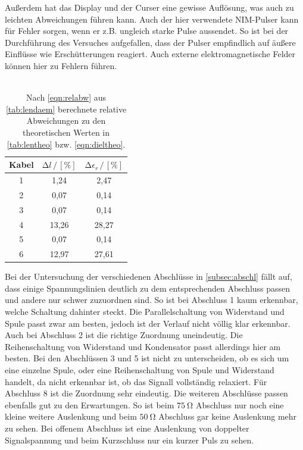 Außerdem hat das Display und der Curser eine gewisse Auflösung, was auch zu leichten Abweichungen führen kann.
Auch der hier verwendete NIM-Pulser kann für Fehler sorgen, wenn er z.B. ungleich starke Pulse aussendet. 
So ist bei der Durchführung des Versuches aufgefallen, dass der Pulser empfindlich auf äußere Einflüsse wie Erschütterungen reagiert. 
Auch externe elektromagnetische Felder können hier zu Fehlern führen. 
\\\\
\begin{table}[H]
    \centering
    \caption{Nach \autoref{eqn:relabw} aus \autoref{tab:lendaem} berechnete relative Abweichungen zu den theoretischen Werten in \autoref{tab:lentheo} bzw. \autoref{eqn:dieltheo}.}
    \begin{tabular}{ccc}
    \toprule
    Kabel & $\increment l \,/\, [\%]$ & $\increment \epsilon_r \,/\, [\%] $\\
    \midrule
    1 &  1,24  & 2,47 \\
    2 &  0,07  & 0,14 \\
    3 &  0,07  & 0,14 \\
    4 & 13,26 & 28,27 \\
    5 &  0,07  & 0,14 \\
    6 & 12,97 & 27,61 \\
    \bottomrule
    \end{tabular}
    \label{tab:relabw}
\end{table}
Bei der Untersuchung der verschiedenen Abschlüsse in \autoref{subsec:abschl} fällt auf, dass einige Spannungslinien deutlich zu dem entsprechenden Abschluss passen und andere nur schwer zuzuordnen sind.
So ist bei Abschluss 1 kaum erkennbar, welche Schaltung dahinter steckt. 
Die Parallelschaltung von Widerstand und Spule passt zwar am besten, jedoch ist der Verlauf nicht völlig klar erkennbar. 
Auch bei Abschluss 2 ist die richtige Zuordnung uneindeutig.
Die Reihenschaltung von Widerstand und Kondensator passt allerdings hier am besten.
Bei den Abschlüssen 3 und 5 ist nicht zu unterscheiden, ob es sich um eine einzelne Spule, oder eine Reihenschaltung von Spule und Widerstand handelt, da nicht erkennbar ist, ob das Signall vollständig relaxiert. 
Für Abschluss 8 ist die Zuordnung sehr eindeutig.
Die weiteren Abschlüsse passen ebenfalls gut zu den Erwartungen. 
So ist beim $\qty{75}{\ohm}$ Abschluss nur noch eine kleine weitere Auslenkung und beim $\qty{50}{\ohm}$ Abschluss gar keine Auslenkung mehr zu sehen. 
Bei offenem Abschluss ist eine Auslenkung von doppelter Signalspannung und beim Kurzschluss nur ein kurzer Puls zu sehen.
